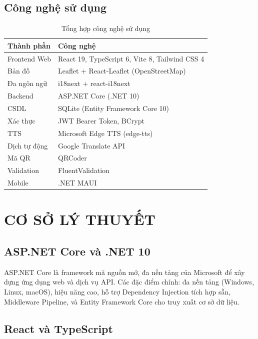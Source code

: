 \documentclass[a4paper,13pt]{report}
\begin{document}
\section{Công nghệ sử dụng}

\begin{table}[H]
\centering
\caption{Tổng hợp công nghệ sử dụng}
\begin{tabularx}{\textwidth}{|l|X|}
\hline
\textbf{Thành phần} & \textbf{Công nghệ} \\
\hline
Frontend Web & React 19, TypeScript 6, Vite 8, Tailwind CSS 4 \\
\hline
Bản đồ & Leaflet + React-Leaflet (OpenStreetMap) \\
\hline
Đa ngôn ngữ & i18next + react-i18next \\
\hline
Backend & ASP.NET Core (.NET 10) \\
\hline
CSDL & SQLite (Entity Framework Core 10) \\
\hline
Xác thực & JWT Bearer Token, BCrypt \\
\hline
TTS & Microsoft Edge TTS (edge-tts) \\
\hline
Dịch tự động & Google Translate API \\
\hline
Mã QR & QRCoder \\
\hline
Validation & FluentValidation \\
\hline
Mobile & .NET MAUI \\
\hline
\end{tabularx}
\end{table}

\chapter{CƠ SỞ LÝ THUYẾT}

\section{ASP.NET Core và .NET 10}

ASP.NET Core là framework mã nguồn mở, đa nền tảng của Microsoft để xây dựng ứng dụng web và dịch vụ API. Các đặc điểm chính: đa nền tảng (Windows, Linux, macOS), hiệu năng cao, hỗ trợ Dependency Injection tích hợp sẵn, Middleware Pipeline, và Entity Framework Core cho truy xuất cơ sở dữ liệu.

\section{React và TypeScript}
\end{document}
